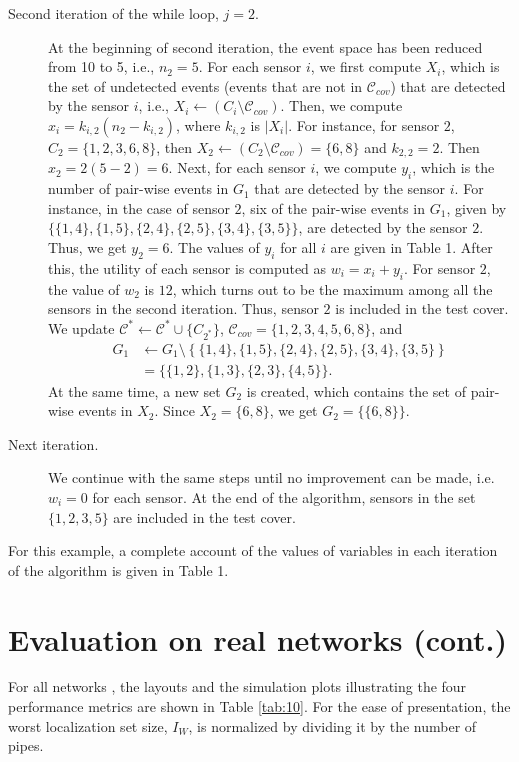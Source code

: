 \documentclass[twocolumn]{autart}
\begin{document}
\begin{description}
\item[Second iteration of the while loop, $j=2$.] At the beginning of second iteration, the event space has been reduced from 10 to 5, i.e., $n_2 = 5$. For each sensor $i$, we first compute $X_i$, which is the set of undetected events (events that are not in $\mathcal{C}_{cov}$) that are detected by the sensor $i$, i.e., $X_i \gets \left(C_i \setminus \mathcal{C}_{cov}\right)$. Then, we compute $x_i = k_{i,2}(n_2 - k_{i,2})$, where $k_{i,2}$ is $| X_i|$. For instance, for sensor $2$, $C_2 = \{1,2,3,6,8 \}$, then $X_2 \gets \left(C_2 \setminus \mathcal{C}_{cov}\right) = \{6,8\}$ and $k_{2,2} = 2$. Then $x_2 = 2(5-2) = 6$. Next, for each sensor $i$, we compute $y_i$, which is the number of pair-wise events in $G_1$ that are detected by the sensor $i$. For instance, in the case of sensor $2$, six of the pair-wise events in $G_1$, given by $\{\{1,4\},\{1,5\},\{2,4\},\{2,5\},\{3,4\},\{3,5\}\}$, are detected by the sensor $2$. Thus, we get $y_2 = 6$. The values of $y_i$ for all $i$ are given in Table 1. After this, the utility of each sensor is computed as $w_i = x_i + y_i$. For sensor $2$, the value of $w_2$ is $12$, which turns out to be the maximum among all the sensors in the second iteration. Thus, sensor $2$ is included in the test cover. 
We update $\mathcal{C}^{{\ast}}\gets \mathcal{C}^{{\ast}} \cup \{C_{2^{\ast}}\}$, $\mathcal{C}_{cov}= \{1,2,3,4,5,6,8\}$, and 
\begin{equation*}
\begin{split}
G_1 &\gets G_1 \setminus   \left\{\{1,4\},\{1,5\},\{2,4\},\{2,5\},\{3,4\},\{3,5\} \right\}\\
&= \{\{1,2\},\{1,3\},\{2,3\},\{4,5\}\}.
\end{split}
\end{equation*}
At the same time, a new set $G_2$ is created, which contains the set of pair-wise events in $X_2$. Since $X_2 = \{6,8\}$, we get $G_2 = \{\{6,8\}\}$.

\item[Next iteration.] We continue with the same steps until no improvement can be made, i.e. $w_i = 0$ for each sensor. At the end of the algorithm, sensors in the set $\{1,2,3,5\}$ are included in the test cover.
\end{description}

For this example, a complete account of the values of variables in each iteration of the algorithm is given in Table 1.

\section{Evaluation on real networks (cont.)}
For all networks \cite{datab,doi:10.1061/(ASCE)WR.1943-5452}, the layouts and the simulation plots illustrating the four performance metrics are shown in Table \ref{tab:10}. For the ease of presentation, the worst localization set size, $I_W$, is normalized by dividing it by the number of pipes.
\end{document}
